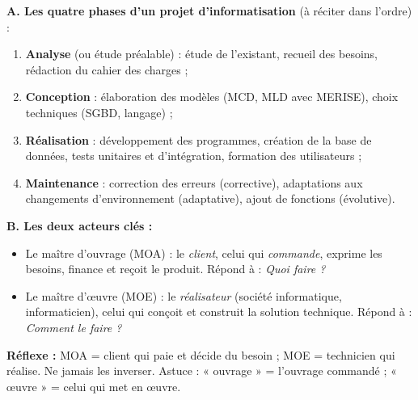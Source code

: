 \documentclass[11pt]{article}
\newcommand{\cle}[1]{{\popxbold\color{popdark}#1}}
\begin{document}
\begin{methode}
\textbf{A. Les quatre phases d'un projet d'informatisation} (à réciter dans l'ordre) :
\begin{enumerate}
\item \textbf{Analyse} (ou étude préalable) : étude de l'existant, recueil des besoins, rédaction du cahier des charges ;
\item \textbf{Conception} : élaboration des modèles (MCD, MLD avec MERISE), choix techniques (SGBD, langage) ;
\item \textbf{Réalisation} : développement des programmes, création de la base de données, tests unitaires et d'intégration, formation des utilisateurs ;
\item \textbf{Maintenance} : correction des erreurs (corrective), adaptations aux changements d'environnement (adaptative), ajout de fonctions (évolutive).
\end{enumerate}
\textbf{B. Les deux acteurs clés :}
\begin{itemize}
\item Le \cle{maître d'ouvrage} (MOA) : le \emph{client}, celui qui \emph{commande}, exprime les besoins, finance et reçoit le produit. Répond à : \emph{Quoi faire ?}
\item Le \cle{maître d'œuvre} (MOE) : le \emph{réalisateur} (société informatique, informaticien), celui qui conçoit et construit la solution technique. Répond à : \emph{Comment le faire ?}
\end{itemize}
\textbf{Réflexe :} MOA = client qui paie et décide du besoin ; MOE = technicien qui réalise. Ne jamais les inverser. Astuce : « ouvrage » = l'ouvrage commandé ; « œuvre » = celui qui met en œuvre.
\end{methode}
\end{document}
